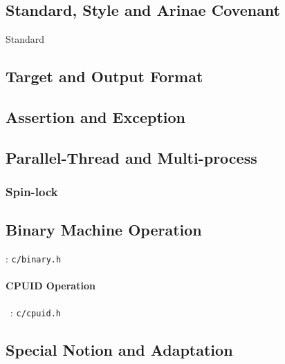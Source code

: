 \subsection{Standard, Style and Arinae Covenant}
{Standard}

\subsection{Target and Output Format}



\subsection{Assertion and Exception}


\subsection{Parallel-Thread and Multi-process}

\subsubsection{Spin-lock}

\subsection{Binary Machine Operation}
: \verb`c/binary.h`

\paragraph{CPUID Operation} \
: \verb`c/cpuid.h`


\subsection{Special Notion and Adaptation}







